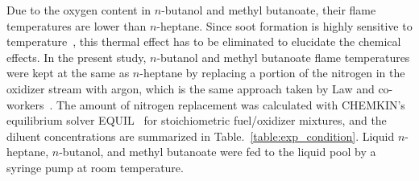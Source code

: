 \documentclass[review,3p,times]{elsarticleUS}
\begin{document}
Due to the oxygen content in $n$-butanol and methyl butanoate, their flame temperatures are lower than $n$-heptane. Since soot formation is highly sensitive to temperature~\cite{wang11}, this thermal effect has to be eliminated to elucidate the chemical effects. In the present study, $n$-butanol and methyl butanoate flame temperatures were kept at the same as $n$-heptane by replacing a portion of the nitrogen in the oxidizer stream with argon, which is the same approach taken by Law and co-workers~\cite{du89,du91,axelbaum91}. The amount of nitrogen replacement was calculated with CHEMKIN's equilibrium solver EQUIL~\cite{chemkin} for stoichiometric fuel/oxidizer mixtures, and the diluent concentrations are summarized in Table.~\ref{table:exp_condition}. Liquid $n$-heptane, $n$-butanol, and methyl butanoate were fed to the liquid pool by a syringe pump at room temperature.

\end{document}
